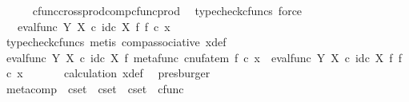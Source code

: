 \begin{isabellebody}
\ \ \ \ \isamarkupfalse%
\ cfunc{\isacharunderscore}{\kern0pt}cross{\isacharunderscore}{\kern0pt}prod{\isacharunderscore}{\kern0pt}comp{\isacharunderscore}{\kern0pt}cfunc{\isacharunderscore}{\kern0pt}prod\ \isamarkupfalse%
\ {\isacharparenleft}{\kern0pt}typecheck{\isacharunderscore}{\kern0pt}cfuncs{\isacharcomma}{\kern0pt}\ force{\isacharparenright}{\kern0pt}\isanewline
\ \ \isamarkupfalse%
\ \isamarkupfalse%
\ {\isachardoublequoteopen}{\isachardot}{\kern0pt}{\isachardot}{\kern0pt}{\isachardot}{\kern0pt}\ {\isacharequal}{\kern0pt}\ {\isacharparenleft}{\kern0pt}eval{\isacharunderscore}{\kern0pt}func\ Y\ X\ {\isasymcirc}\isactrlsub c\ id\isactrlsub c\ X\ {\isasymtimes}\isactrlsub f\ f{\isacharparenright}{\kern0pt}\ {\isasymcirc}\isactrlsub c\ x{}{\isachardoublequoteclose}\isanewline
\ \ \ \ \isamarkupfalse%
\ {\isacharparenleft}{\kern0pt}typecheck{\isacharunderscore}{\kern0pt}cfuncs{\isacharcomma}{\kern0pt}\ metis\ comp{\isacharunderscore}{\kern0pt}associative{}\ x{\isacharunderscore}{\kern0pt}def{\isacharparenright}{\kern0pt}\isanewline
\ \ \isamarkupfalse%
\ \isamarkupfalse%
\ {\isachardoublequoteopen}{\isacharparenleft}{\kern0pt}eval{\isacharunderscore}{\kern0pt}func\ Y\ X\ {\isasymcirc}\isactrlsub c\ id\isactrlsub c\ X\ {\isasymtimes}\isactrlsub f\ metafunc\ {\isacharparenleft}{\kern0pt}cnufatem\ f{\isacharparenright}{\kern0pt}{\isacharparenright}{\kern0pt}\ {\isasymcirc}\isactrlsub c\ x{}\ {\isacharequal}{\kern0pt}\ {\isacharparenleft}{\kern0pt}eval{\isacharunderscore}{\kern0pt}func\ Y\ X\ {\isasymcirc}\isactrlsub c\ id\isactrlsub c\ X\ {\isasymtimes}\isactrlsub f\ f{\isacharparenright}{\kern0pt}\ {\isasymcirc}\isactrlsub c\ x{}{\isachardoublequoteclose}\isanewline
\ \ \ \ \isamarkupfalse%
\ \ calculation\ x{\isacharunderscore}{\kern0pt}def\ \isamarkupfalse%
\ presburger\isanewline
{}\isamarkupfalse%
%
\endisatagproof
{\isafoldproof}%
%
\isadelimproof
%
\endisadelimproof
%
\isadelimdocument
%
\endisadelimdocument
%
\isatagdocument
%
\isamarkuptrue%
%
\endisatagdocument
{\isafolddocument}%
%
\isadelimdocument
%
\endisadelimdocument
{}\isamarkupfalse%
\ meta{\isacharunderscore}{\kern0pt}comp\ {\isacharcolon}{\kern0pt}{\isacharcolon}{\kern0pt}\ {\isachardoublequoteopen}cset\ {\isasymRightarrow}\ cset\ {\isasymRightarrow}\ cset\ {\isasymRightarrow}\ cfunc{\isachardoublequoteclose}\ \ \ \isanewline

\end{isabellebody}
